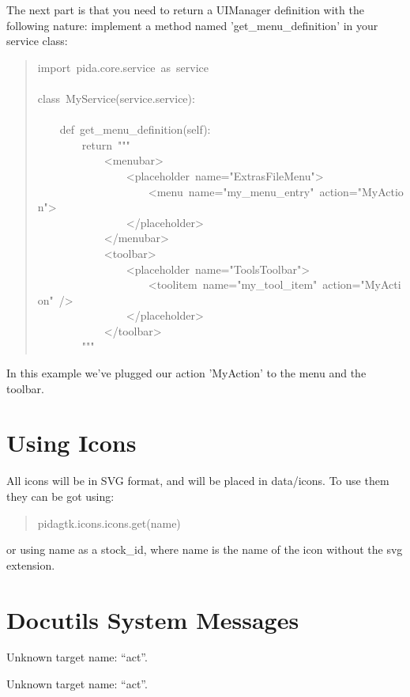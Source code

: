 \documentclass[10pt,a4paper,english]{article}
\begin{document}
The next part is that you need to
return a UIManager definition with the following nature: implement a method
named 'get{\_}menu{\_}definition' in your service class:
\begin{quote}{\ttfamily \raggedright \noindent
import~pida.core.service~as~service~\\
~\\
class~MyService(service.service):~\\
~\\
~~~~def~get{\_}menu{\_}definition(self):~\\
~~~~~~~~return~"{}"{}"~\\
~~~~~~~~~~~~<menubar>~\\
~~~~~~~~~~~~~~~~<placeholder~name="ExtrasFileMenu">~\\
~~~~~~~~~~~~~~~~~~~~<menu~name="my{\_}menu{\_}entry"~action="MyAction">~\\
~~~~~~~~~~~~~~~~</placeholder>~\\
~~~~~~~~~~~~</menubar>~\\
~~~~~~~~~~~~<toolbar>~\\
~~~~~~~~~~~~~~~~<placeholder~name="ToolsToolbar">~\\
~~~~~~~~~~~~~~~~~~~~<toolitem~name="my{\_}tool{\_}item"~action="MyAction"~/>~\\
~~~~~~~~~~~~~~~~</placeholder>~\\
~~~~~~~~~~~~</toolbar>~\\
~~~~~~~~"{}"{}"
}\end{quote}

In this example we've plugged our action 'MyAction' to the menu and the toolbar.



\hypertarget{using-icons}{}
\section*{Using Icons}

All icons will be in SVG format, and will be placed in data/icons. To use them
they can be got using:
\begin{quote}{\ttfamily \raggedright \noindent
pidagtk.icons.icons.get(name)
}\end{quote}

or using name as a stock{\_}id, where name is the name of the icon without the svg
extension.



\section*{Docutils System Messages}

Unknown target name: ``act''.


Unknown target name: ``act''.
\end{document}
